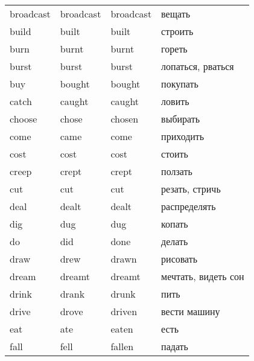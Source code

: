\begin{longtable}{| m{} | m{} | m{} | m{} |}
    broadcast          & broadcast           & broadcast               & вещать              \\
    build              & built               & built                   & строить             \\
    burn               & burnt               & burnt                   & гореть              \\
    burst              & burst               & burst                   & лопаться, рваться   \\
    buy                & bought              & bought                  & покупать            \\
    catch              & caught              & caught                  & ловить              \\
    choose             & chose               & chosen                  & выбирать            \\
    come               & came                & come                    & приходить           \\
    cost               & cost                & cost                    & стоить              \\
    creep              & crept               & crept                   & ползать             \\
    cut                & cut                 & cut                     & резать, стричь      \\
    deal               & dealt               & dealt                   & распределять        \\
    dig                & dug                 & dug                     & копать              \\
    do                 & did                 & done                    & делать              \\
    draw               & drew                & drawn                   & рисовать            \\
    dream              & dreamt              & dreamt                  & мечтать, видеть сон \\
    drink              & drank               & drunk                   & пить                \\
    drive              & drove               & driven                  & вести машину        \\
    eat                & ate                 & eaten                   & есть                \\
    fall               & fell                & fallen                  & падать              \\

\end{longtable}
